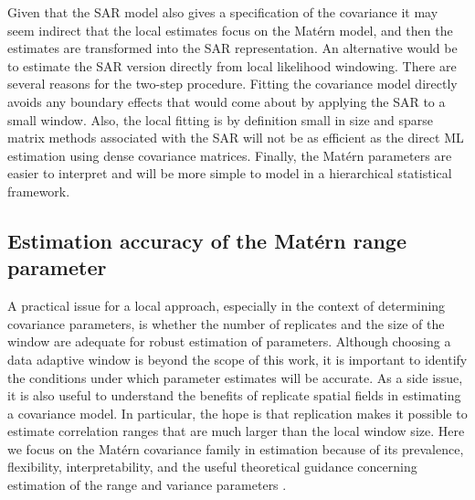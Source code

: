 \documentclass[review]{elsarticle}
\begin{document}
Given that the SAR model also gives a specification of the covariance it may seem indirect that the local estimates focus on the Mat\'ern model, and then the estimates are transformed into the SAR representation. An alternative would be to estimate the SAR version directly from local likelihood windowing. There are several  reasons for the two-step procedure. Fitting the covariance model directly avoids any boundary effects that would come about by applying the SAR to a small window. Also, the local fitting is by definition small in size and sparse matrix methods associated with the SAR will not be as efficient as the direct ML estimation using dense covariance matrices.  Finally, the Mat\'ern parameters are easier to interpret and will be more simple to model in a hierarchical statistical framework. 

\subsection{Estimation accuracy of the Mat\'ern range parameter}
\label{ss:2}
A practical issue for a local approach, especially in the context of determining covariance parameters, is whether the number of replicates and the size of the window are adequate for robust estimation of  parameters. 
Although choosing a data adaptive window is beyond the scope of this work, it is important to identify the conditions under which parameter estimates will be accurate. As a side issue, it is also useful to understand the benefits of replicate spatial fields in estimating a covariance model. In particular, the hope is that replication makes it possible to estimate correlation ranges that are much larger than the local window size. 
Here we  focus on the Mat\'ern covariance family in estimation because of its prevalence, flexibility, interpretability, and the useful theoretical guidance  concerning estimation of the range and variance parameters \cite{kaufman2013role}. 
\end{document}
